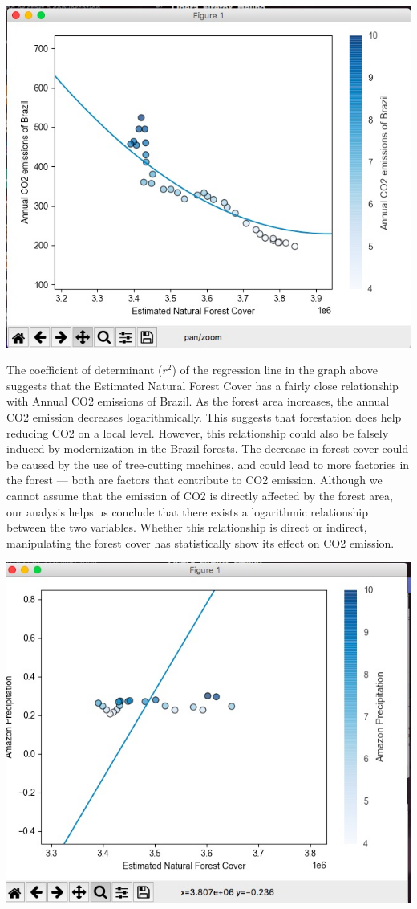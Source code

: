 \documentclass[12pt]{article}
\begin{document}
\begin{enumerate}
\begin{text}
\includegraphics[scale=0.5]{pics/Forest-CO2.png}

The coefficient of determinant ($r^2$) of the regression line in the graph above suggests that the Estimated Natural Forest Cover has a fairly close relationship with Annual CO2 emissions of Brazil. As the forest area increases, the annual CO2 emission decreases logarithmically. This suggests that forestation does help reducing CO2 on a local level. However, this relationship could also be falsely induced by modernization in the Brazil forests. The decrease in forest cover could be caused by the use of tree-cutting machines, and could lead to more factories in the forest — both are factors that contribute to CO2 emission. Although we cannot assume that the emission of CO2 is directly affected by the forest area, our analysis helps us conclude that there exists a logarithmic relationship between the two variables. Whether this relationship is direct or indirect, manipulating the forest cover has statistically show its effect on CO2 emission.

\includegraphics[scale=0.5]{pics/Forest-Precipitation.png}


\end{text}
\end{enumerate}
\end{document}
